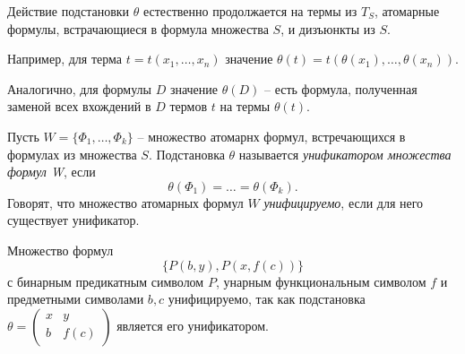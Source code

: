 Действие подстановки $\theta$ естественно продолжается на термы из $T_S$, атомарные формулы, встрачающиеся в формула множества $S$, и дизъюнкты из $S$.

Например, для терма $t = t(x_1,\ldots,x_n)$ значение $\theta(t)=t(\theta(x_1),\ldots,\theta(x_n))$.

Аналогично, для формулы $D$ значение $\theta(D)$ -- есть формула, полученная заменой всех вхождений в $D$ термов $t$ на термы $\theta(t)$.

Пусть $W=\{\Phi_1,\ldots,\Phi_k\}$ -- множество атомарнх формул, встречающихся в формулах из множества $S$. Подстановка $\theta$ называется \textit{унификатором множества формул W}, если $$\theta(\Phi_1)=\ldots=\theta(\Phi_k).$$
Говорят, что множество атомарных формул $W$ \textit{унифицируемо}, если для него существует унификатор.

\begin{example}
    Множество формул $$\{P(b,y),P(x,f(c))\}$$ с бинарным предикатным символом $P$, унарным функциональным символом $f$ и предметными символами $b,c$ унифицируемо, так как подстановка $\theta = \begin{pmatrix} x & y \\ b & f(c) \end{pmatrix}$ является его унификатором.
\end{example}